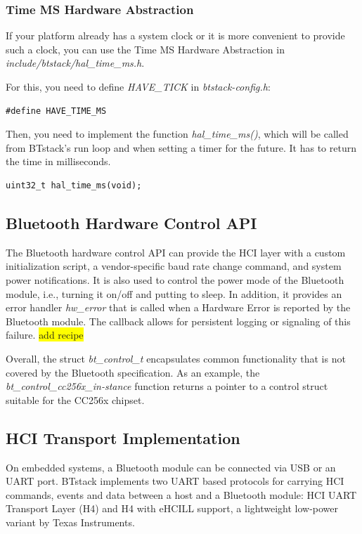 \documentclass[a4paper,titlepage,oneside,12pt]{amsart} %
\newcommand{\todo}[1]{\colorbox{yellow}{#1}}
\begin{document}
\subsubsection{Time MS Hardware Abstraction}
\label{ssection:timeMSAbstraction}
If your platform already has a system clock or it is more convenient to provide such a clock, you can use the Time MS Hardware Abstraction in \emph{include/btstack/hal\_time\_ms.h}.

For this, you need to define \emph{HAVE\_TICK} in \emph{btstack-config.h}:
\begin{lstlisting}
#define HAVE_TIME_MS
\end{lstlisting}

Then, you need to implement the function \emph{hal\_time\_ms()}, which will be called from BTstack's run loop and when setting a timer for the future. It has to return the time in milliseconds.

\begin{lstlisting}
uint32_t hal_time_ms(void);
\end{lstlisting}

\subsection{Bluetooth Hardware Control API}
\label{section:bt_hw_control}
The Bluetooth hardware control API can provide the HCI layer with a custom initialization script, a vendor-specific baud rate change command, and system power notifications. It is also used to control the power mode of the Bluetooth module, i.e., turning it on/off and putting to sleep. In addition, it provides an error handler \emph{hw\_error} that is called when a Hardware Error is reported by the Bluetooth module. The callback allows for persistent logging or signaling of this failure. \todo{add recipe}

Overall, the struct \emph{bt\_control\_t} encapsulates common functionality that is not covered by the Bluetooth specification. As an example, the \emph{bt\_control\_cc256x\_in-stance} function returns a pointer to a control struct suitable for the CC256x chipset.

 \subsection{HCI Transport Implementation}
 \label{section:hci_transport}
On embedded systems, a Bluetooth module can be connected via USB or an UART port. BTstack implements two UART based protocols for carrying HCI commands, events and data between a host and a Bluetooth module: HCI UART Transport Layer (H4) and H4 with eHCILL support, a lightweight low-power variant by Texas Instruments.
\end{document}

